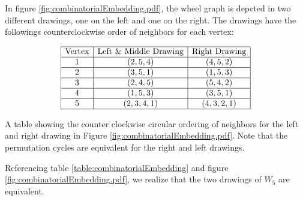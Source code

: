 In figure \ref{fig:combinatorialEmbedding.pdf}, the wheel graph is depcted in two different drawings, one on the left and one on the right. 
The drawings have the followings counterclockwise order of neighbors for each vertex:
\begin{table}[!htbp]\label{table:combinatorialEmbedding}
\begin{center}
$$\begin{array}{|c|c|c|}\hline
\text{Vertex}&\text{Left \& Middle Drawing}&\text{Right Drawing}\\\hline
1&(2,5,4)& (4,5,2) 
\\\hline
2&(3,5,1) & (1,5,3) 
\\\hline
3&(2,4,5)& (5,4,2) 
\\\hline
4& (1,5,3)  & (3,5,1) 
\\\hline
5&(2,3,4,1)& (4,3,2,1) 
\\\hline
\end{array} $$
\caption{A table showing the counter clockwise circular ordering of neighbors for the left and right drawing in Figure \ref{fig:combinatorialEmbedding.pdf}.  Note that the permutation cycles are equivalent for the right and left drawings.}
\end{center} 
\end{table}
Referencing table \ref{table:combinatorialEmbedding} and figure \ref{fig:combinatorialEmbedding.pdf}, we realize that the two drawings of $W_5$ are equivalent.  






 









